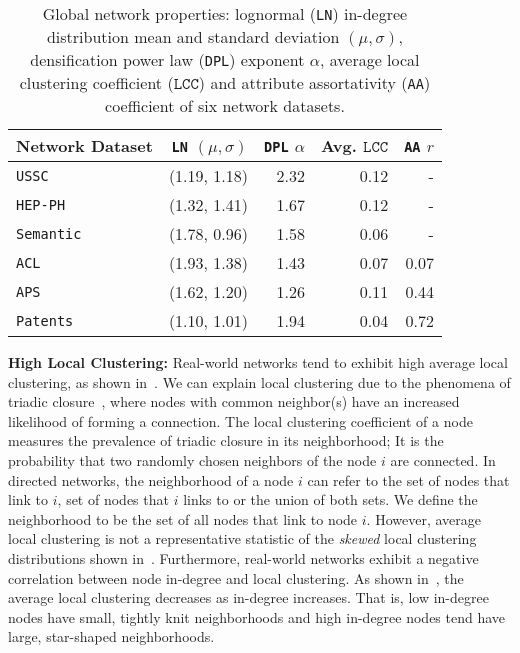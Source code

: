 \begin{table}
 \center
 {
  \begin{tabular}[c]{lrrrr} \toprule
  Network Dataset &  \texttt{LN} $(\mu, \sigma)$ & \texttt{DPL} $\alpha$       &  Avg. ${\texttt{LCC}}$  & \texttt{AA} $r$   \\ \midrule
  \texttt{USSC}     &   (1.19, 1.18) & 2.32     & 0.12    & -     \\
  \texttt{HEP-PH}   &   (1.32, 1.41) & 1.67     & 0.12    & -     \\
  \texttt{Semantic} &   (1.78, 0.96)  & 1.58     & 0.06    & -     \\   \midrule
  \texttt{ACL}      &   (1.93, 1.38)  & 1.43     & 0.07    & 0.07     \\
  \texttt{APS}      &   (1.62, 1.20)  & 1.26     & 0.11    & 0.44     \\
  \texttt{Patents}  &   (1.10, 1.01)   & 1.94     & 0.04    & 0.72    \\
   \bottomrule
  \end{tabular}
  \vspace{1mm}
  \caption{Global network properties: lognormal (\texttt{LN}) in-degree distribution mean and standard deviation $(\mu, \sigma)$,
  densification power law (\texttt{DPL}) exponent $\alpha$, average local clustering coefficient (${\texttt{LCC}}$)
  and attribute assortativity (\texttt{AA}) coefficient of six network datasets.}
  \label{table:netstats}
 }
\end{table}

\textbf{High Local Clustering:} Real-world networks tend to exhibit high average local clustering, as shown in~. We can explain local clustering due to the phenomena of triadic closure~\cite{simmel1950sociology,
newman2001clustering}, where nodes with common neighbor(s) have an increased
likelihood of forming a connection.
The local clustering coefficient of a node measures the prevalence of triadic closure in its neighborhood; It is the probability that two randomly chosen neighbors of the node $i$ are connected. In directed networks, the neighborhood of a node $i$ can refer to the
set of nodes that link to $i$, set of nodes that $i$ links to or the union of
both sets. We define the neighborhood to be the set of all nodes that link to
node $i$.  However, average local clustering is not a
representative statistic of the \textit{skewed} local clustering distributions
shown in~. Furthermore, real-world networks exhibit a negative
correlation between node in-degree  and local clustering. As shown in~, the average local clustering  decreases as in-degree increases.
That is, low in-degree nodes have small, tightly knit neighborhoods and high
in-degree nodes tend have large, star-shaped neighborhoods. 

